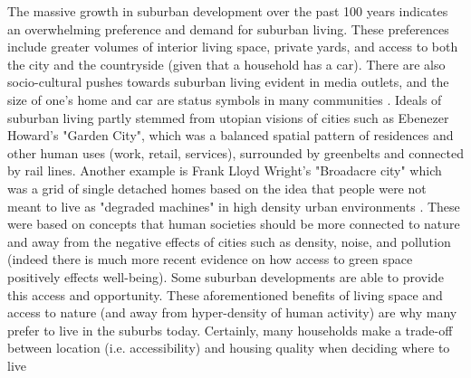 The massive growth in suburban development over the past 100 years indicates an overwhelming preference and demand for suburban living. These preferences include greater volumes of interior living space, private yards, and access to both the city and the countryside (given that a household has a car). There are also socio-cultural pushes towards suburban living evident in media outlets, and the size of one's home and car are status symbols in many communities \cite{kunstler_geography_1994}. Ideals of suburban living partly stemmed from utopian visions of cities such as Ebenezer Howard's "Garden City", which was a balanced spatial pattern of residences and other human uses (work, retail, services), surrounded by greenbelts and connected by rail lines. Another example is Frank Lloyd Wright's "Broadacre city" which was a grid of single detached homes based on the idea that people were not meant to live as "degraded machines" in high density urban environments \cite{wegener_land-use_2004}. These were based on concepts that  human societies should be more connected to nature and away from the negative effects of cities such as density, noise, and pollution (indeed there is much more recent evidence on how access to green space positively effects well-being). Some suburban developments are able to provide this access and opportunity. These aforementioned benefits of living space and access to nature (and away from hyper-density of human activity) are why many prefer to live in the suburbs today. Certainly, many households make a trade-off between location (i.e. accessibility) and housing quality when deciding where to live \cite{lee_neighborhood_1994,alonso_location_1964}

